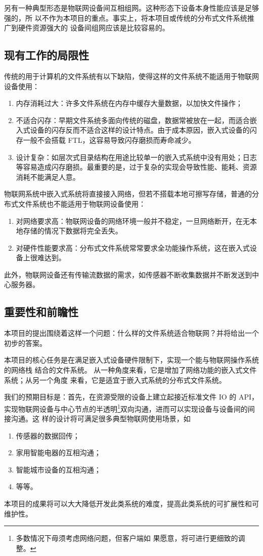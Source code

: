 \documentclass{ctexart}
\begin{document}
另有一种典型形态是物联网设备间互相组网。这种形态下设备本身性能应该是足够强的，所
以不作为本项目的重点。事实上，将本项目或传统的分布式文件系统推广到硬件资源强大的
设备间组网应该是比较容易的。

\subsection{现有工作的局限性}

传统的用于计算机的文件系统有以下缺陷，使得这样的文件系统不能适用于物联网设备使用：
\begin{enumerate}
	\item 内存消耗过大：许多文件系统在内存中缓存大量数据，以加快文件操作；
	\item 不适合闪存：早期文件系统多面向传统的磁盘，数据常被放在一起，而适合嵌入式设备的闪存反而不适合这样的设计特点。由于成本原因，嵌入式设备的闪存一般不会搭载 FTL，这容易导致闪存磨损而寿命减少。
	\item 设计复杂：如层次式目录结构在用途比较单一的嵌入式系统中没有用处；日志等容易造成闪存磨损。最重要的是，过于复杂的实现会导致性能、能耗、资源消耗不能满足人意。
\end{enumerate}

物联网系统中嵌入式系统将直接接入网络，但若不搭载本地可擦写存储，普通的分布式文件系统也不能适用于物联网设备使用：
\begin{enumerate}
	\item 对网络要求高：物联网设备的网络环境一般并不稳定，一旦网络断开，在无本地存储的情况下数据将完全丢失。
	\item 对硬件性能要求高：分布式文件系统常常要求全功能操作系统，这在嵌入式设备上很难达到。
\end{enumerate}

此外，物联网设备还有传输流数据的需求，如传感器不断收集数据并不断发送到中心服务器。

\subsection{重要性和前瞻性}

本项目的提出围绕着这样一个问题：什么样的文件系统适合物联网？并将给出一个初步的答案。

本项目的核心任务是在满足嵌入式设备硬件限制下，实现一个能与物联网操作系统的网络栈
结合的文件系统。 从一种角度来看，它是增加了网络功能的嵌入式文件系统；从另一个角度
来看，它是适宜于嵌入式系统的分布式文件系统。

我们的预期目标是：首先，在资源受限的设备上建立起接近标准文件 IO 的 API，
实现物联网设备与中心节点的半透明\footnote{多数情况下毋须考虑网络问题，但客户端如
  果愿意，将可进行更细致的调整。}双向沟通，进而可以实现设备与设备间的间接沟通。这
样的设计将可满足很多典型物联网使用场景，如
\begin{enumerate}
\item 传感器的数据回传；
\item 家用智能电器的互相沟通；
\item 智能城市设备的互相沟通；
\item 等等。
\end{enumerate}
本项目的成果将可以大大降低开发此类系统的难度，提高此类系统的可扩展性和可维护性。
\end{document}
